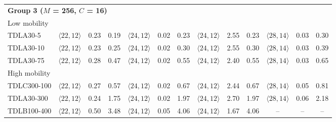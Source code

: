 \begin{table}[htbp]
\begin{tabular}{lcccccccccccc}
\midrule
\multicolumn{13}{l}{\textbf{Group 3 ($M$ = 256, $C$ = 16)}} \\
\multicolumn{13}{l}{Low mobility} \\
\quad TDLA30-5 & $\langle 22,12\rangle$ & 0.23 & 0.19 & $\langle 24,12\rangle$ & 0.02 & 0.23 & $\langle 24,12\rangle$ & 2.55 & 0.23 & $\langle 28,14\rangle$ & 0.03 & 0.30 \\
\quad TDLA30-10 & $\langle 22,12\rangle$ & 0.23 & 0.25 & $\langle 24,12\rangle$ & 0.02 & 0.30 & $\langle 24,12\rangle$ & 2.55 & 0.30 & $\langle 28,14\rangle$ & 0.03 & 0.39 \\
\quad TDLA30-75 & $\langle 22,12\rangle$ & 0.28 & 0.47 & $\langle 24,12\rangle$ & 0.02 & 0.55 & $\langle 24,12\rangle$ & 2.40 & 0.55 & $\langle 28,14\rangle$ & 0.03 & 0.65 \\
\multicolumn{13}{l}{High mobility} \\
\quad TDLC300-100 & $\langle 22,12\rangle$ & 0.27 & 0.57 & $\langle 24,12\rangle$ & 0.02 & 0.67 & $\langle 24,12\rangle$ & 2.44 & 0.67 & $\langle 28,14\rangle$ & 0.05 & 0.81 \\
\quad TDLA30-300 & $\langle 22,12\rangle$ & 0.24 & 1.75 & $\langle 24,12\rangle$ & 0.02 & 1.97 & $\langle 24,12\rangle$ & 2.70 & 1.97 & $\langle 28,14\rangle$ & 0.06 & 2.18 \\
\quad TDLB100-400 & $\langle 22,12\rangle$ & 0.50 & 3.48 & $\langle 24,12\rangle$ & 0.05 & 4.06 & $\langle 24,12\rangle$ & 1.67 & 4.06 & -- & -- & -- \\
\bottomrule
\end{tabular}
\vspace{4pt}
\end{table}
